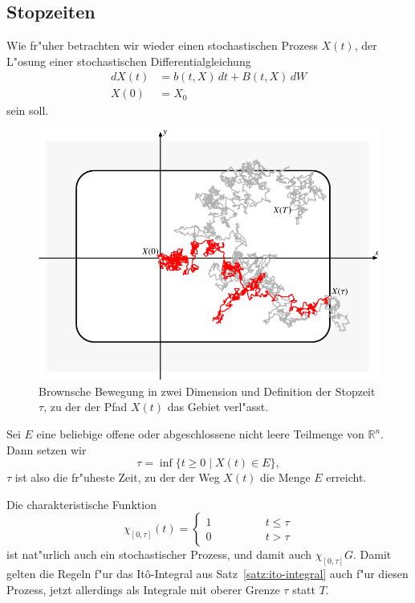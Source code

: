 \subsection{Stopzeiten}
Wie fr"uher betrachten wir wieder einen stochastischen Prozess $X(t)$,
der L"osung einer stochastischen Differentialgleichung
\begin{equation}
\begin{aligned}
dX(t)&=b(t,X)\,dt + B(t,X)\,dW
\\
X(0)&=X_0
\end{aligned}
\label{stochastisch:stopzeitdgl}
\end{equation}
sein soll.
\begin{figure}
\centering
\includegraphics{chapters/images/stochastisch-2.pdf}
\caption{Brownsche Bewegung in zwei Dimension und Definition der
Stopzeit $\tau$, zu der der Pfad $X(t)$ das Gebiet verl"asst.
\label{stochastisch:pfad}}
\end{figure}

\begin{definition}
Sei $E$ eine beliebige offene oder abgeschlossene nicht leere Teilmenge
von $\mathbb R^n$.
Dann setzen wir
\[
\tau = \inf\{t\ge 0\;|\;X(t)\in E\},
\]
$\tau$ ist also die fr"uheste Zeit, zu der der Weg $X(t)$ die Menge $E$
erreicht.
\end{definition}

Die charakteristische Funktion
\[
\chi_{[0,\tau]}(t)=\begin{cases}
1\qquad\qquad&t\le \tau\\
0            &t>\tau
\end{cases}
\]
ist nat"urlich auch ein stochastischer Prozess, und damit auch 
$\chi_{[0,\tau]}G$.
Damit gelten die Regeln f"ur das It\^o-Integral aus
Satz~\ref{satz:ito-integral} auch f"ur diesen Prozess, jetzt allerdings
als Integrale mit oberer Grenze $\tau$ statt $T$.

